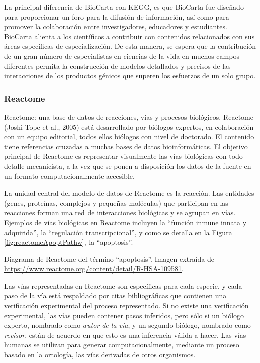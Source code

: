 \documentclass[12pt,twoside]{reedthesis}
\begin{document}
La principal diferencia de BioCarta con KEGG, es que BioCarta fue diseñado para proporcionar un foro para la difusión de información, así como para promover la colaboración entre investigadores, educadores y estudiantes. BioCarta alienta a los científicos a contribuir con contenidos relacionados con sus áreas específicas de especialización. De esta manera, se espera que la contribución de un gran número de especialistas en ciencias de la vida en muchos campos diferentes permita la construcción de modelos detallados y precisos de las interacciones de los productos génicos que superen los esfuerzos de un solo grupo.

\hypertarget{reactome}{%
\subsubsection{Reactome}\label{reactome}}

Reactome: una base de datos de reacciones, vías y procesos biológicos. Reactome (Joshi-Tope et al., 2005) está desarrollado por biólogos expertos, en colaboración con un equipo editorial, todos ellos biólogos con nivel de doctorado. El contenido tiene referencias cruzadas a muchas bases de datos bioinformáticas. El objetivo principal de Reactome es representar visualmente las vías biológicas con todo detalle mecanicista, a la vez que se ponen a disposición los datos de la fuente en un formato computacionalmente accesible.

\par

La unidad central del modelo de datos de Reactome es la reacción. Las entidades (genes, proteínas, complejos y pequeñas moléculas) que participan en las reacciones forman una red de interacciones biológicas y se agrupan en vías. Ejemplos de vías biológicas en Reactome incluyen la ``función inmune innata y adquirida'', la ``regulación transcripcional'', y como se detalla en la Figura \ref{fig:reactomeApoptPathw}, la ``apoptosis''.

Diagrama de Reactome del término ``apoptosis''. Imagen extraída de \url{https://www.reactome.org/content/detail/R-HSA-109581}.



\par

Las vías representadas en Reactome son específicas para cada especie, y cada paso de la vía está respaldado por citas bibliográficas que contienen una verificación experimental del proceso representado. Si no existe una verificación experimental, las vías pueden contener pasos inferidos, pero sólo si un biólogo experto, nombrado como \emph{autor de la vía}, y un segundo biólogo, nombrado como \emph{revisor}, están de acuerdo en que esto es una inferencia válida a hacer. Las vías humanas se utilizan para generar computacionalmente, mediante un proceso basado en la ortología, las vías derivadas de otros organismos.
\end{document}
